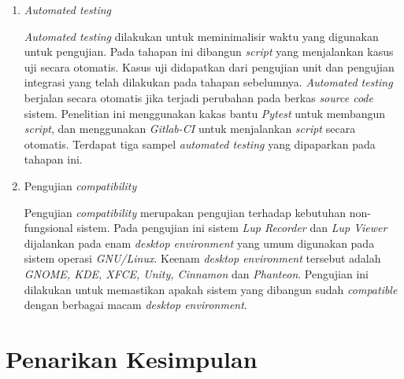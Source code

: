 \begin{enumerate}[
leftmargin=0pt, itemindent=20pt,
labelwidth=15pt, labelsep=5pt, listparindent=0.7cm,
align=left]
  Pengujian validasi menguji apakah sistem yang dibangun sudah sesuai dengan
  kebutuhan yang didefinisikan. Pengujian validasi fokus terhadap
  \emph{user-visible action} dan \emph{user-recognizable output} dari sistem
  \parencite{pressman2010software}. Maka pada tahapan ini seluruh skenario
  kebutuhan diuji. Pengujian validasi dilakukan menggunakan metode
  \emph{black-box testing}. Teknik yang digunakan untuk mendapatkan kasus uji
  dan data uji adalah teknik \emph{equivalence partitioning} dan \emph{boundary
    value analysis}. Kedua teknik tersebut digunakan untuk menghindari
  \emph{rigorous testing} atau mencoba semua kemungkinan.

\item \emph{Automated testing}

  \emph{Automated testing} dilakukan untuk meminimalisir waktu yang digunakan
  untuk pengujian. Pada tahapan ini dibangun \emph{script} yang menjalankan
  kasus uji secara otomatis. Kasus uji didapatkan dari pengujian unit dan
  pengujian integrasi yang telah dilakukan pada tahapan
  sebelumnya. \emph{Automated testing} berjalan secara otomatis jika terjadi
  perubahan pada berkas \emph{source code} sistem. Penelitian ini menggunakan
  kakas bantu \emph{Pytest} untuk membangun \emph{script}, dan menggunakan
  \emph{Gitlab-CI} untuk menjalankan \emph{script} secara otomatis. Terdapat
  tiga sampel \emph{automated testing} yang dipaparkan pada tahapan ini.

\item Pengujian \emph{compatibility}

  Pengujian \emph{compatibility} merupakan pengujian terhadap
  kebutuhan non-fungsional sistem. Pada pengujian
  ini sistem \emph{Lup Recorder} dan \emph{Lup Viewer} dijalankan pada
  enam \emph{desktop environment} yang umum digunakan pada sistem
  operasi \emph{GNU/Linux}. Keenam \emph{desktop environment} tersebut
  adalah \emph{GNOME, KDE, XFCE, Unity, Cinnamon} dan \emph{Phanteon}.
  Pengujian ini dilakukan untuk memastikan apakah sistem
  yang dibangun sudah \emph{compatible} dengan berbagai macam
  \emph{desktop environment}.

\end{enumerate}

\section{Penarikan Kesimpulan}


